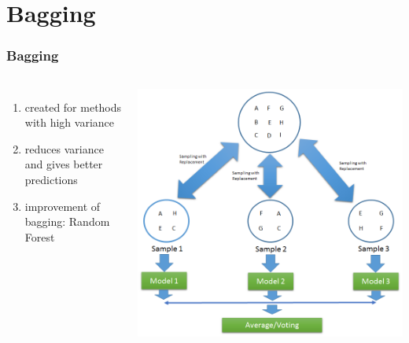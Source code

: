 \section{Bagging}

\begin{frame}
    \frametitle{Bagging}
    \begin{columns}[c] %
    
    \begin{enumerate}
    \item created for methods with high variance
    \item reduces variance and gives better predictions
    \item improvement of bagging: 
    \newline Random Forest
    \end{enumerate}
    

	\begin{center}		
		\includegraphics[height=0.7\textheight]{images/bagging.png}
	\end{center}

    
    \end{columns}
\end{frame}